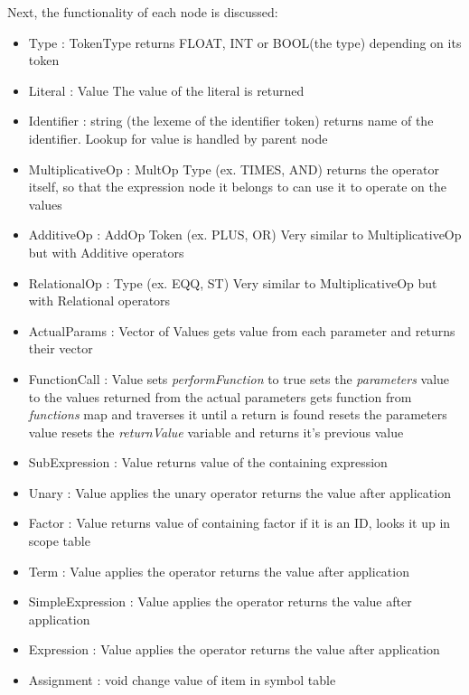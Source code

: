 Next, the functionality of each node is discussed:
\begin{itemize}
	\item Type : TokenType
		\subitem returns FLOAT, INT or BOOL(the type) depending on its token
	\item Literal : Value
		\subitem The value of the literal is returned
	\item Identifier : string (the lexeme of the identifier token)
		\subitem returns name of the identifier. Lookup for value is handled by parent node
	\item MultiplicativeOp : MultOp Type (ex. TIMES, AND)
		\subitem returns the operator itself, so that the expression node it belongs to can use it to operate on the values
	\item AdditiveOp : AddOp Token (ex. PLUS, OR)
		\subitem Very similar to MultiplicativeOp but with Additive operators
	\item RelationalOp : Type (ex. EQQ, ST)
		\subitem Very similar to MultiplicativeOp but with Relational operators
	\item ActualParams : Vector of Values
		\subitem gets value from each parameter and returns their vector
	\item FunctionCall : Value
		\subitem sets \textit{performFunction} to true
		\subitem sets the \textit{parameters} value to the values returned from the actual parameters
		\subitem gets function from \textit{functions} map and traverses it until a return is found
		\subitem resets the parameters value
		\subitem resets the \textit{returnValue} variable and returns it's previous value
	\item SubExpression : Value
		\subitem returns value of the containing expression
	\item Unary : Value
		\subitem applies the unary operator
		\subitem returns the value after application
	\item Factor : Value
		\subitem returns value of containing factor
		\subitem if it is an ID, looks it up in scope table
	\item Term : Value
		\subitem applies the operator
		\subitem returns the value after application
	\item SimpleExpression : Value
		\subitem applies the operator
		\subitem returns the value after application
	\item Expression : Value
		\subitem applies the operator
		\subitem returns the value after application
	\item Assignment : void
		\subitem change value of item in symbol table

\end{itemize}
